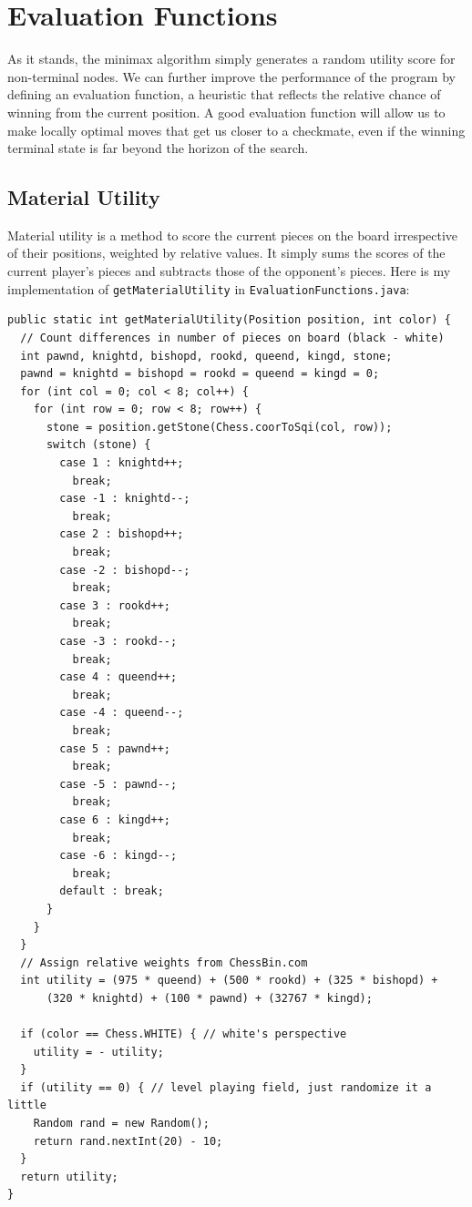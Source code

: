 \documentclass{article}
\begin{document}
\section{Evaluation Functions}

As it stands, the minimax algorithm simply generates a random utility score for non-terminal nodes. We can further improve the performance of the program by defining an evaluation function, a heuristic that reflects the relative chance of winning from the current position. A good evaluation function will allow us to make locally optimal moves that get us closer to a checkmate, even if the winning terminal state is far beyond the horizon of the search.

\subsection{Material Utility}

Material utility is a method to score the current pieces on the board irrespective of their positions, weighted by relative values. It simply sums the scores of the current player's pieces and subtracts those of the opponent's pieces. Here is my implementation of \verb`getMaterialUtility` in \verb`EvaluationFunctions.java`:

\begin{lstlisting}
public static int getMaterialUtility(Position position, int color) {
  // Count differences in number of pieces on board (black - white)
  int pawnd, knightd, bishopd, rookd, queend, kingd, stone;
  pawnd = knightd = bishopd = rookd = queend = kingd = 0;
  for (int col = 0; col < 8; col++) {
    for (int row = 0; row < 8; row++) {
      stone = position.getStone(Chess.coorToSqi(col, row));
      switch (stone) {
        case 1 : knightd++;
          break;
        case -1 : knightd--;
          break;
        case 2 : bishopd++;
          break;
        case -2 : bishopd--;
          break;
        case 3 : rookd++;
          break;
        case -3 : rookd--;
          break;
        case 4 : queend++;
          break;
        case -4 : queend--;
          break;
        case 5 : pawnd++;
          break;
        case -5 : pawnd--;
          break;
        case 6 : kingd++;
          break;
        case -6 : kingd--;
          break;
        default : break;
      }
    }
  }
  // Assign relative weights from ChessBin.com
  int utility = (975 * queend) + (500 * rookd) + (325 * bishopd) + 
      (320 * knightd) + (100 * pawnd) + (32767 * kingd);
  
  if (color == Chess.WHITE) { // white's perspective
    utility = - utility;
  }
  if (utility == 0) { // level playing field, just randomize it a little
    Random rand = new Random();
    return rand.nextInt(20) - 10;
  }
  return utility;
}
\end{lstlisting}
\end{document}
